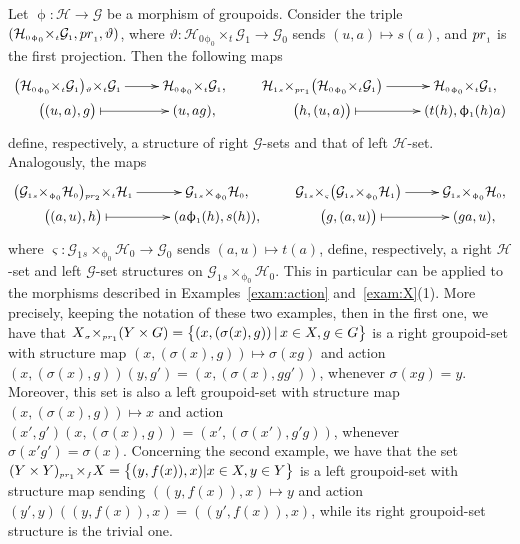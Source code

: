 \documentclass[11pt]{article}
\numberwithin{equation}{section}
\newcommand{\Go}{\cG_{\Sscript{0}}}
\newcommand{\Ga}{\cG_{\Sscript{1}}}
\newcommand{\Ho}{\cH_{\Sscript{0}}}
\newcommand{\Ha}{\cH_{\Sscript{1}}}
\newcommand{\cG}{{\mathcal G}}
\newcommand{\cH}{{\mathcal H}}
\newcommand{\Sscript}[1]{\scriptscriptstyle{#1}}
\newcommand{\due}[3]{{}_{{#2 }} {#1}_{{ #3}} }
\newcommand{\phia}{\upphi_{\Sscript{1}}}
\begin{document}
\begin{Example}\label{exam: HG}Let $\upphi\colon \cH \!\to\! \cG$ be a morphism of groupoids. Consider the triple $(\Ho \due \times {\Sscript{\upphi_0}} { \Sscript{t}} \Ga, {\rm pr}_{\Sscript{1}}, \vartheta)$, where $\vartheta\colon \Ho \due \times {\Sscript{\upphi_0}} { \Sscript{t}} \Ga \to \Go$ sends $(u,a) \mapsto s(a)$, and ${\rm pr}_{\Sscript{1}}$ is the first projection. Then the following maps
\begin{gather*}
\xymatrix@R=0pt{ \big(\Ho \due \times {\Sscript{\upphi_0}} { \Sscript{t}} \Ga\big) \due \times {\Sscript{\vartheta}} { \Sscript{t}} \Ga \ar@{->}^-{}[r] & \Ho \due \times {\Sscript{\upphi_0}} { \Sscript{t}} \Ga, \\ \big((u,a),g\big)\ar@{|->}^-{}[r] & (u, ag), } \qquad \xymatrix@R=0pt{ \Ha \due \times {\Sscript{s}} { \Sscript{{\rm pr}_1}} \big(\Ho \due
\times {\Sscript{\upphi_0}} { \Sscript{t}} \Ga\big) \ar@{->}^-{}[r] & \Ho \due \times {\Sscript{\upphi_0}} { \Sscript{t}} \Ga, \\ \big(h, (u,a)\big) \ar@{|->}^-{}[r] & (t(h),\phia(h)a) }
\end{gather*}
define, respectively, a structure of right $\cG$-sets and that of left $\cH$-set. Analogously, the maps
\begin{gather*}
\xymatrix@R=0pt{ \big(\Ga \due \times {\Sscript{s}} { \Sscript{\upphi_0}} \Ho\big) \due \times {\Sscript{{\rm pr}_2}} { \Sscript{t}} \Ha \ar@{->}^-{}[r] & \Ga \due \times
{\Sscript{s}} { \Sscript{\upphi_0}} \Ho, \\ \big((a,u),h \big)\ar@{|->}^-{}[r] & (a\phia(h), s(h)), } \qquad
\xymatrix@R=0pt{ \Ga \due \times {\Sscript{s}} { \Sscript{\varsigma}} \big(\Ga \due \times {\Sscript{s}} { \Sscript{\upphi_0}} \Ha\big) \ar@{->}^-{}[r] & \Ga \due \times
{\Sscript{s}} { \Sscript{\upphi_0}} \Ho, \\ \big(g, (a,u)\big)\ar@{|->}^-{}[r] & (ga,u), }
\end{gather*}
where $\varsigma\colon \Ga \due \times {\Sscript{s}} { \Sscript{\upphi_0}} \Ho \to \Go$ sends $(a,u) \mapsto t(a)$, define, respectively, a right $\cH$-set and left $\cG$-set structures on $\Ga \due \times {\Sscript{s}} { \Sscript{\upphi_0}} \Ho$. This in particular can be applied to the morphisms described in Examples~\ref{exam:action} and~\ref{exam:X}(1). More precisely, keeping the notation of these two examples, then in the first one, we have that $X \due \times {\Sscript{\sigma}} { \Sscript{{\rm pr}_1}} (Y \times G) =\big\{ (x, (\sigma(x),g)) \,|\, x \in X, g \in G \big\} $ is a right groupoid-set with structure map $(x, (\sigma(x),g)) \mapsto \sigma(xg)$ and action $(x, (\sigma(x),g)) (y, g' )= (x, (\sigma(x),gg'))$, whenever $\sigma(xg)=y$. Moreover, this set is also a left groupoid-set with structure map $(x, (\sigma(x),g)) \mapsto x$ and action $(x',g') (x, (\sigma(x),g)) = (x', (\sigma(x'),g'g))$, whenever $\sigma(x'g')=\sigma(x)$. Concerning the second example, we have that the set $(Y\times Y) \due \times {\Sscript{{\rm pr}_1}} { \Sscript{f}} X =\big\{ (y,f(x)),x)| x \in X, y \in Y\big\}$ is a left groupoid-set with structure map sending $((y,f(x)),x) \mapsto y$ and action $(y',y) ((y, f(x)),x) = ((y',f(x)),x)$, while its right groupoid-set structure is the trivial one.

\end{Example}
\end{document}

